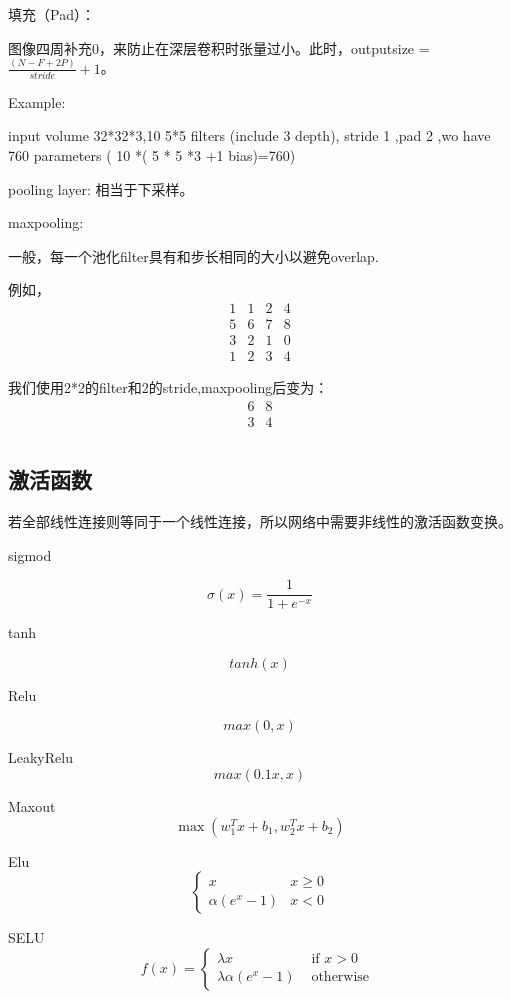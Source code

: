 \documentclass[a4paper]{article}
\begin{document}
填充（Pad）：

图像四周补充0，来防止在深层卷积时张量过小。此时，outputsize = $\frac{(N-F+2P)}{stride}+1$。

Example:

input volume 32*32*3,10 5*5 filters (include 3 depth), stride 1 ,pad 2 ,wo have 760 parameters ( 10 *( 5 * 5 *3 +1 bias)=760)

pooling layer:
相当于下采样。

maxpooling:

一般，每一个池化filter具有和步长相同的大小以避免overlap.

例如，
$$\begin{matrix}  
    1 & 1 & 2 & 4 \\
    5 & 6 & 7 & 8 \\
    3 & 2 & 1 & 0 \\
    1 & 2 & 3 & 4
\end{matrix}$$

我们使用2*2的filter和2的stride,maxpooling后变为：
$$\begin{matrix}  
    6 & 8 \\
    3 & 4  \\
   
\end{matrix}$$



\subsection{激活函数}
若全部线性连接则等同于一个线性连接，所以网络中需要非线性的激活函数变换。

sigmod 

$$
\sigma(x)=\frac{1}{1+e^{-x}}
$$

tanh

$$tanh(x)$$

Relu

$$max(0,x)$$

LeakyRelu
$$max(0.1x,x)$$

Maxout
$$
\max \left(w_{1}^{T} x+b_{1}, w_{2}^{T} x+b_{2}\right)
$$

Elu
$$
\begin{cases}
x & x \geq 0 \\ 
\alpha\left(e^{x}-1\right) & x<0
\end{cases}
$$

SELU
$$
f(x)= \begin{cases}\lambda x & \text { if } x>0 \\ \lambda \alpha\left(e^{x}-1\right) & \text { otherwise }\end{cases}
$$
\end{document}
